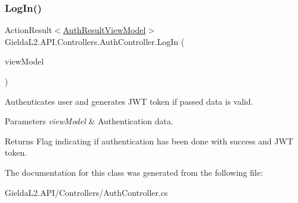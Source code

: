 \subsubsection{\texorpdfstring{LogIn()}{LogIn()}}
{\footnotesize\ttfamily Action\+Result$<$\mbox{\hyperlink{class_gielda_l2_1_1_a_p_i_1_1_view_models_1_1_view_1_1_auth_result_view_model}{Auth\+Result\+View\+Model}}$>$ Gielda\+L2.\+A\+P\+I.\+Controllers.\+Auth\+Controller.\+Log\+In (\begin{DoxyParamCaption}\item[{\mbox{\hyperlink{class_gielda_l2_1_1_a_p_i_1_1_view_models_1_1_view_1_1_log_in_view_model}{Log\+In\+View\+Model}}}]{view\+Model }\end{DoxyParamCaption})}



Authenticates user and generates J\+WT token if passed data is valid. 


\begin{DoxyParams}{Parameters}
{\em view\+Model} & Authentication data.\\
\hline
\end{DoxyParams}
\begin{DoxyReturn}{Returns}
Flag indicating if authentication has been done with success and J\+WT token.
\end{DoxyReturn}


The documentation for this class was generated from the following file\+:\begin{DoxyCompactItemize}
\item 
Gielda\+L2.\+A\+P\+I/\+Controllers/Auth\+Controller.\+cs\end{DoxyCompactItemize}
